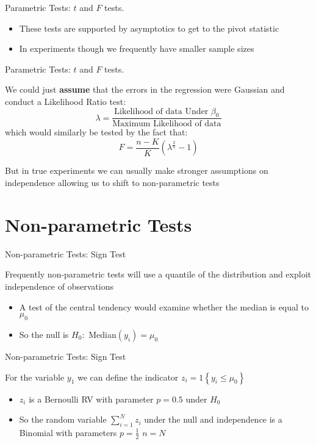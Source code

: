 \documentclass{beamer}
\begin{document}
\begin{frame}{Parametric Tests: $t$ and $F$ tests.}
    \begin{card}
	\begin{itemize}
		\item These tests are supported by asymptotics to get to the pivot statistic
		\item In experiments though we frequently have smaller sample sizes
	\end{itemize}
	\end{card}
\end{frame}
\begin{frame}{Parametric Tests: $t$ and $F$ tests.}
    \begin{card}
	We could just \textbf{assume} that the errors in the regression were Gaussian and conduct a Likelihood Ratio test:
		$$\lambda=\frac{\text{Likelihood of data Under $\beta_0$}}{\text{Maximum Likelihood of data}}$$
		which would similarly be tested by the fact that:
		$$F=\frac{n-K}{K}(\lambda^{\frac{2}{n}}-1)$$
	\end{card}
	\begin{card} But in true experiments we can usually make stronger assumptions on independence allowing us to shift to non-parametric tests
	\end{card}
\end{frame}
\section{Non-parametric Tests}

\begin{frame}{Non-parametric Tests: Sign Test}
	\begin{card}
 Frequently non-parametric tests will use a quantile of the distribution and exploit independence of observations
 \begin{itemize}
		\item A test of the central tendency would  examine whether the median is equal to $\mu_0$
		\item So the null is $H_0:$ Median$(y_i)=\mu_0$
\end{itemize}
\end{card}
\end{frame}

\begin{frame}{Non-parametric Tests: Sign Test}
\begin{card} For the variable $y_1$ we can define the indicator $z_i=\mathrm{1}\left\{y_{i}\leq \mu_0 \right\}$ 
\begin{itemize}
		\item  $z_i$ is a Bernoulli RV with parameter $p=0.5$ under $H_0$
		\item So the random variable $\sum_{i=1}^N z_i$ under the null and independence is a Binomial with parameters $p=\frac{1}{2}$ $n=N$
	\end{itemize}
\end{card}
\end{frame}
\end{document}
